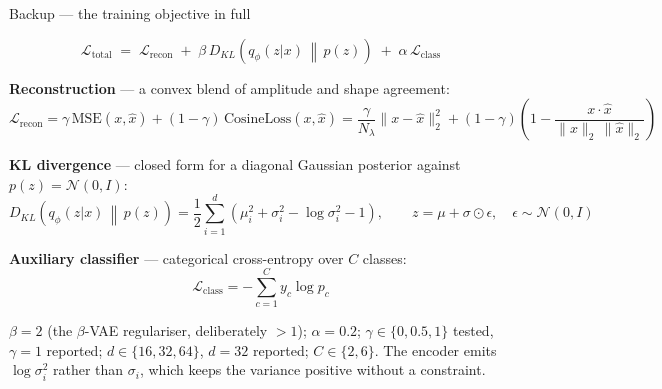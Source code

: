 \documentclass[aspectratio=169, 11pt]{beamer}
\newcommand{\srcnote}[1]{{\scriptsize\color{gray}#1}}
\begin{document}
\appendix

\begin{frame}{Backup --- the training objective in full}
  \vspace{0.1em}
  {\setlength{\abovedisplayskip}{4pt}\setlength{\belowdisplayskip}{4pt}%
   \setlength{\abovedisplayshortskip}{2pt}\setlength{\belowdisplayshortskip}{2pt}%
  \[
    \mathcal{L}_{\text{total}} \;=\; \mathcal{L}_{\text{recon}}
      \;+\; \beta\, D_{KL}\!\left(q_\phi(z|x) \,\middle\|\, p(z)\right)
      \;+\; \alpha\, \mathcal{L}_{\text{class}}
  \]
  \vspace{-0.2em}
  {\footnotesize
  \textbf{\color{accent}Reconstruction} --- a convex blend of amplitude and shape agreement:
  \[
    \mathcal{L}_{\text{recon}}
      = \gamma\,\mathrm{MSE}(x,\hat{x}) + (1-\gamma)\,\mathrm{CosineLoss}(x,\hat{x})
      = \frac{\gamma}{N_\lambda}\lVert x-\hat{x}\rVert_2^2
        + (1-\gamma)\!\left(1 - \frac{x \cdot \hat{x}}
                                      {\lVert x\rVert_2\,\lVert \hat{x}\rVert_2}\right)
  \]

  \textbf{\color{accent}KL divergence} --- closed form for a diagonal Gaussian
  posterior against $p(z)=\mathcal{N}(0,I)$:
  \[
    D_{KL}\!\left(q_\phi(z|x)\,\middle\|\,p(z)\right)
      = \frac{1}{2}\sum_{i=1}^{d}\left(\mu_i^2 + \sigma_i^2 - \log\sigma_i^2 - 1\right),
    \qquad
    z = \mu + \sigma \odot \epsilon,\quad \epsilon \sim \mathcal{N}(0,I)
  \]

  \textbf{\color{accent}Auxiliary classifier} --- categorical cross-entropy over $C$ classes:
  \[
    \mathcal{L}_{\text{class}} = -\sum_{c=1}^{C} y_c \log p_c
  \]
  }}
  \vspace{0.2em}
  \srcnote{$\beta = 2$ (the $\beta$-VAE regulariser, deliberately $>1$);
    $\alpha = 0.2$; $\gamma \in \{0, 0.5, 1\}$ tested, $\gamma = 1$ reported;
    $d \in \{16, 32, 64\}$, $d = 32$ reported; $C \in \{2, 6\}$.
    The encoder emits $\log \sigma_i^2$ rather than $\sigma_i$, which keeps the
    variance positive without a constraint.}
\end{frame}
\end{document}
